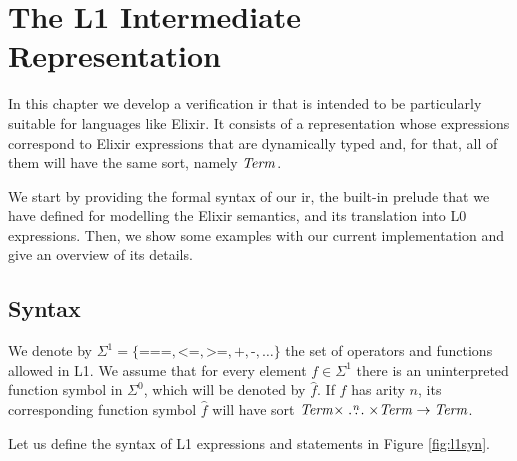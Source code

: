 \chapter{The L1 Intermediate Representation}
\label{cap:intermediateRepresentation}


In this chapter we develop a verification \gls{ir} that is intended to be 
particularly suitable for languages like Elixir. It consists of a representation
whose expressions correspond to Elixir expressions that are dynamically typed
and, for that, all of them will have the same sort, namely $\mathit{Term}$.

We start by providing the formal syntax of our \gls{ir}, the built-in prelude
that we have defined for modelling the Elixir semantics, and its translation
into L0 expressions.  Then, we show some examples with our current
implementation and give an overview of its details.

\section{Syntax}

We denote by $\Sigma^{1} = \{ \texttt{===}, \texttt{<=}, \texttt{>=}, 
\texttt{+}, \texttt{-}, \dots \}$ the set of operators and functions allowed in
L1. We assume that for every element $f \in \Sigma^{1}$ there is an 
uninterpreted function symbol in $\Sigma^{0}$, which will be denoted by 
$\widehat{f}$. If $f$ has arity $n$, its corresponding function symbol 
$\widehat{f}$ will have sort $\mathit{Term} \times \stackrel{n}{\dots} \times \mathit{Term}
\rightarrow \mathit{Term}$.

Let us define the syntax of L1 expressions and statements in Figure
\ref{fig:l1syn}.

